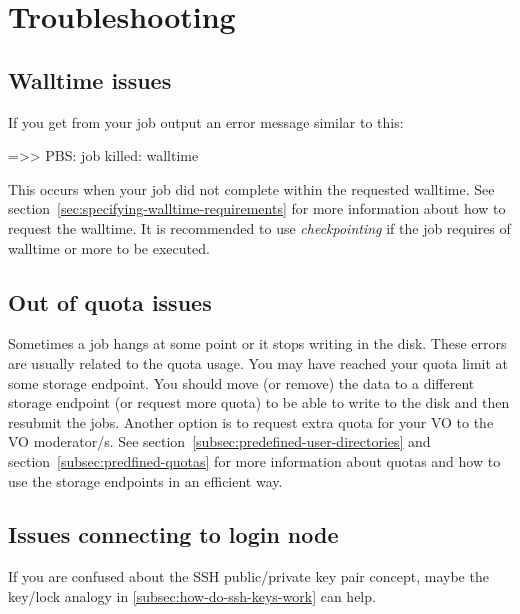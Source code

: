 \chapter{Troubleshooting}
\label{ch:troubleshooting}



\section{Walltime issues}
If you get from your job output an error message similar to this:

\begin{prompt}
 =>> PBS: job killed: walltime %
\end{prompt}

This occurs when your job did not complete within the requested walltime.
See section~\ref{sec:specifying-walltime-requirements} for more information about how to request the walltime.
It is recommended to use \emph{checkpointing} if the job requires  of walltime or more to be executed.



\section{Out of quota issues}

Sometimes a job hangs at some point or it stops writing in the disk. These errors are usually
related to the quota usage. You may have reached your quota limit at some storage endpoint.
You should move (or remove) the data to a different storage endpoint (or request more quota) to be able to write to the disk and then resubmit the jobs.
\ifgent
Another option is to request extra quota for your VO to the VO moderator/s.
See section~\ref{subsec:predefined-user-directories} and section~\ref{subsec:predfined-quotas} for more information about
quotas and how to use the storage endpoints in an efficient way.
\fi

\section{Issues connecting to login node}
\label{sec:connecting-issues}

If you are confused about the SSH public/private key pair concept, maybe the
key/lock analogy in \autoref{subsec:how-do-ssh-keys-work} can help.

